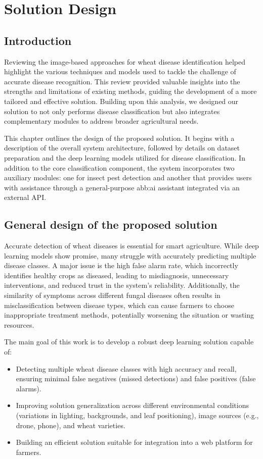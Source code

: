 
\chapter{Solution Design }


\section{Introduction}

Reviewing the image-based approaches for wheat disease identification helped highlight the various techniques and models used to tackle the challenge of accurate disease recognition. This review provided valuable insights into the strengths and limitations of existing methods, guiding the development of a more tailored and effective solution. Building upon this analysis, we designed our solution to not only performs disease classification but also integrates complementary modules to address broader agricultural needs.

This chapter outlines the design of the proposed solution. It begins with a description of the overall system architecture, followed by details on dataset preparation and the deep learning models utilized for disease classification. In addition to the core classification component, the system incorporates two auxiliary modules: one for insect pest detection and another that provides users with assistance through a general-purpose \gls{abb:ai} assistant integrated via an external API.


\section{General design of the proposed solution}
Accurate detection of wheat diseases is essential for smart agriculture. While deep learning models show promise, many struggle with accurately predicting multiple disease classes. A major issue is the high false alarm rate, which incorrectly identifies healthy crops as diseased, leading to misdiagnosis, unnecessary interventions, and reduced trust in the system's reliability. Additionally, the similarity of symptoms across different fungal diseases often results in misclassification between disease types, which can cause farmers to choose inappropriate treatment methods, potentially worsening the situation or wasting resources.

The main goal of this work is to develop a robust deep learning solution capable of:
\begin{itemize}
    \item Detecting multiple wheat disease classes with high accuracy and recall, ensuring minimal false negatives (missed detections) and false positives (false alarms).
    \item Improving solution generalization across different environmental conditions (variations in lighting, backgrounds, and leaf positioning), image sources (e.g., drone, phone), and wheat varieties.
    \item Building an efficient solution suitable for integration into a  web platform for farmers.
\end{itemize}

